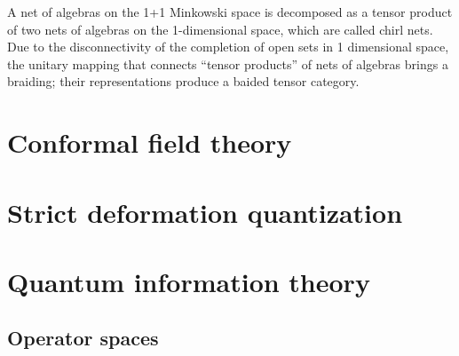 \documentclass[12pt]{report}
\begin{document}
A net of algebras on the 1+1 Minkowski space is decomposed as a tensor product of two nets of algebras on the 1-dimensional space, which are called chirl nets.
Due to the disconnectivity of the completion of open sets in 1 dimensional space, the unitary mapping that connects ``tensor products'' of nets of algebras brings a braiding; their representations produce a baided tensor category.



\chapter{Conformal field theory}



\chapter{Strict deformation quantization}






\chapter{Quantum information theory}
\section{Operator spaces}
\end{document}
